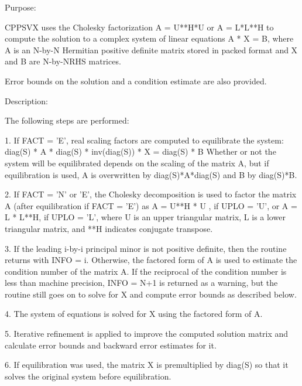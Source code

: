  \begin{DoxyParagraph}{Purpose\+: }
\begin{DoxyVerb} CPPSVX uses the Cholesky factorization A = U**H*U or A = L*L**H to
 compute the solution to a complex system of linear equations
    A * X = B,
 where A is an N-by-N Hermitian positive definite matrix stored in
 packed format and X and B are N-by-NRHS matrices.

 Error bounds on the solution and a condition estimate are also
 provided.\end{DoxyVerb}
 
\end{DoxyParagraph}
\begin{DoxyParagraph}{Description\+: }
\begin{DoxyVerb} The following steps are performed:

 1. If FACT = 'E', real scaling factors are computed to equilibrate
    the system:
       diag(S) * A * diag(S) * inv(diag(S)) * X = diag(S) * B
    Whether or not the system will be equilibrated depends on the
    scaling of the matrix A, but if equilibration is used, A is
    overwritten by diag(S)*A*diag(S) and B by diag(S)*B.

 2. If FACT = 'N' or 'E', the Cholesky decomposition is used to
    factor the matrix A (after equilibration if FACT = 'E') as
       A = U**H * U ,  if UPLO = 'U', or
       A = L * L**H,  if UPLO = 'L',
    where U is an upper triangular matrix, L is a lower triangular
    matrix, and **H indicates conjugate transpose.

 3. If the leading i-by-i principal minor is not positive definite,
    then the routine returns with INFO = i. Otherwise, the factored
    form of A is used to estimate the condition number of the matrix
    A.  If the reciprocal of the condition number is less than machine
    precision, INFO = N+1 is returned as a warning, but the routine
    still goes on to solve for X and compute error bounds as
    described below.

 4. The system of equations is solved for X using the factored form
    of A.

 5. Iterative refinement is applied to improve the computed solution
    matrix and calculate error bounds and backward error estimates
    for it.

 6. If equilibration was used, the matrix X is premultiplied by
    diag(S) so that it solves the original system before
    equilibration.\end{DoxyVerb}
 
\end{DoxyParagraph}

